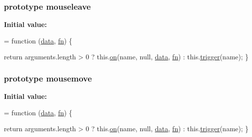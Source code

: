 \subsubsection[{\texorpdfstring{mouseleave}{mouseleave}}]{ {\bf prototype} mouseleave}\hypertarget{jquery-2_82_81-vsdoc_8js_a97f1b922fe119361e2016713603fbbab}{}\label{jquery-2_82_81-vsdoc_8js_a97f1b922fe119361e2016713603fbbab}
{\bfseries Initial value\+:}
\begin{DoxyCode}
= \textcolor{keyword}{function} (\hyperlink{jquery-2_82_81-vsdoc_8js_a609407b3456fdc3c5671a9fc4a226ff7}{data}, \hyperlink{jquery-2_82_81-vsdoc_8js_acef6bdaf6b9b20fdcca1ea86f0902c3b}{fn}) \{
        

        \textcolor{keywordflow}{return} arguments.length > 0 ?
            this.\hyperlink{jquery-2_82_81-vsdoc_8js_ae453b412b883f60220d73468ef6c6dbc}{on}(name, null, \hyperlink{jquery-2_82_81-vsdoc_8js_a609407b3456fdc3c5671a9fc4a226ff7}{data}, \hyperlink{jquery-2_82_81-vsdoc_8js_acef6bdaf6b9b20fdcca1ea86f0902c3b}{fn}) :
            this.\hyperlink{jquery-2_82_81-vsdoc_8js_a2388c4114d5e3e4eab020f973641519c}{trigger}(name);
    \}
\end{DoxyCode}
\subsubsection[{\texorpdfstring{mousemove}{mousemove}}]{ {\bf prototype} mousemove}\hypertarget{jquery-2_82_81-vsdoc_8js_a5b230e0d0748ddfdaef9b1a0fb09d254}{}\label{jquery-2_82_81-vsdoc_8js_a5b230e0d0748ddfdaef9b1a0fb09d254}
{\bfseries Initial value\+:}
\begin{DoxyCode}
= \textcolor{keyword}{function} (\hyperlink{jquery-2_82_81-vsdoc_8js_a609407b3456fdc3c5671a9fc4a226ff7}{data}, \hyperlink{jquery-2_82_81-vsdoc_8js_acef6bdaf6b9b20fdcca1ea86f0902c3b}{fn}) \{
        

        \textcolor{keywordflow}{return} arguments.length > 0 ?
            this.\hyperlink{jquery-2_82_81-vsdoc_8js_ae453b412b883f60220d73468ef6c6dbc}{on}(name, null, \hyperlink{jquery-2_82_81-vsdoc_8js_a609407b3456fdc3c5671a9fc4a226ff7}{data}, \hyperlink{jquery-2_82_81-vsdoc_8js_acef6bdaf6b9b20fdcca1ea86f0902c3b}{fn}) :
            this.\hyperlink{jquery-2_82_81-vsdoc_8js_a2388c4114d5e3e4eab020f973641519c}{trigger}(name);
    \}
\end{DoxyCode}
